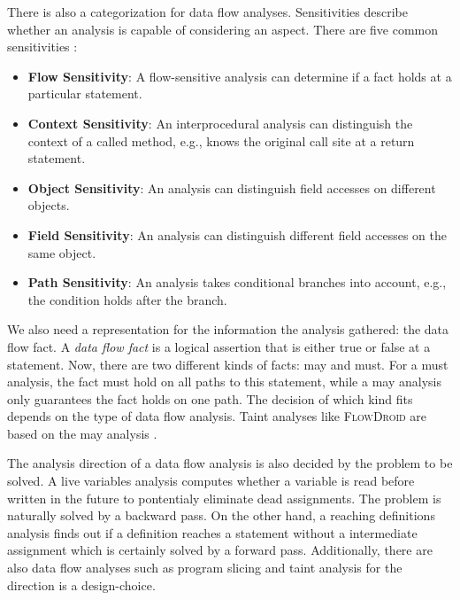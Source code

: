 \documentclass[../draft.tex]{subfiles}
\begin{document}
    There is also a categorization for data flow analyses. 
    Sensitivities describe whether an analysis is capable of considering an aspect. 
    There are five common sensitivities \cite{Khedker2009,Arzt2017PhD}:
    \begin{itemize}
        \item \textbf{Flow Sensitivity}: A flow-sensitive analysis can determine if a fact holds at a particular statement.
        \item \textbf{Context Sensitivity}: An interprocedural analysis can distinguish the context of a called method, e.g., knows the original call site at a return statement.
        \item \textbf{Object Sensitivity}: An analysis can distinguish field accesses on different objects.
        \item \textbf{Field Sensitivity}: An analysis can distinguish different field accesses on the same object.
        \item \textbf{Path Sensitivity}: An analysis takes conditional branches into account, e.g., the condition holds after the branch.
    \end{itemize}

    We also need a representation for the information the analysis gathered: the data flow fact. 
    A \textit{data flow fact} is a logical assertion that is either true or false at a statement. 
    Now, there are two different kinds of facts: may and must. 
    For a must analysis, the fact must hold on all paths to this statement, while a may analysis only guarantees the fact holds on one path. 
    The decision of which kind fits depends on the type of data flow analysis. 
    Taint analyses like \textsc{FlowDroid} are based on the may analysis \cite{Arzt2017PhD}.

    The analysis direction of a data flow analysis is also decided by the problem to be solved. 
    A live variables analysis computes whether a variable is read before written in the future to pontentialy eliminate dead assignments. 
    The problem is naturally solved by a backward pass. 
    On the other hand, a reaching definitions analysis finds out if a definition reaches a statement without a intermediate assignment which is certainly solved by a forward pass.
    Additionally, there are also data flow analyses such as program slicing\footnotemark{} and taint analysis for the direction is a design-choice.
    
\end{document}
